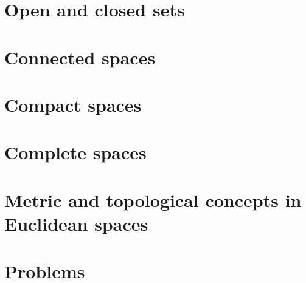 \section{Open and closed sets}

\section{Connected spaces}

\section{Compact spaces}

\section{Complete spaces}

\section{Metric and topological concepts in Euclidean spaces}

\section*{Problems}
